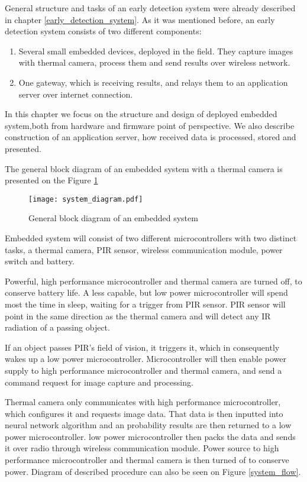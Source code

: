 General structure and tasks of an early detection system were already described in chapter \ref{early_detection_system}.
As it was mentioned before, an early detection system consists of two different components:

\begin{enumerate} 
    \item Several small embedded devices, deployed in the field. 
        They capture images with thermal camera, process them and send results over wireless network.
    \item One gateway, which is receiving results, and relays them to an application server over internet connection.
\end{enumerate} 

In this chapter we focus on the structure and design of deployed embedded system,both from hardware and firmware point of perspective.
We also describe construction of an application server, how received data is processed, stored and presented.

The general block diagram of an embedded system with a thermal camera is presented on the Figure \ref{system_diagram} 

\begin{figure}[ht]
        \centering
        \texttt{[image: system\_diagram.pdf]} 
        \caption{ General block diagram of an embedded system}
        \label{system_diagram}
\end{figure}

Embedded system will consist of two different microcontrollers with two distinct tasks, a thermal camera, PIR sensor, wireless communication module, power switch and battery.

Powerful, high performance microcontroller and thermal camera are turned off, to conserve battery life.
A less capable, but low power microcontroller will spend most the time in sleep, waiting for a trigger from PIR sensor.
PIR sensor will point in the same direction as the thermal camera and will detect any IR radiation of a passing object.

If an object passes PIR's field of vision, it triggers it, which in consequently wakes up a low power microcontroller.
Microcontroller will then enable power supply to high performance microcontroller and thermal camera, and send a command request for image capture and processing.

Thermal camera only communicates with high performance microcontroller, which configures it and requests image data.
That data is then inputted into neural network algorithm and an probability results are then returned to a low power microcontroller.
low power microcontroller then packs the data and sends it over radio through wireless communication module.
Power source to high performance microcontroller and thermal camera is then turned of to conserve power.
Diagram of described procedure can also be seen on Figure \ref{system_flow}.

